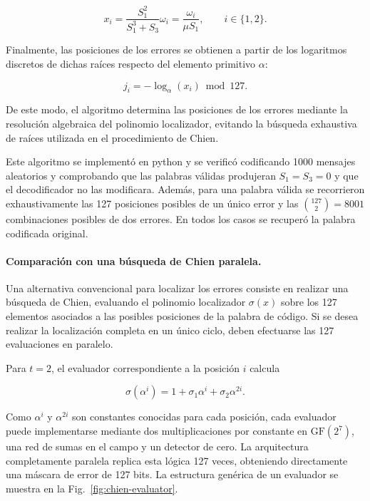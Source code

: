 \documentclass[10pt,a4paper]{article}
\begin{document}
\begin{equation}
    x_i
    =
    \frac{S_1^2}{S_1^3+S_3}\omega_i
    =
    \frac{\omega_i}{\mu S_1},
    \qquad i\in\{1,2\}.
\end{equation}

Finalmente, las posiciones de los errores se obtienen
a partir de los logaritmos discretos de dichas raíces
respecto del elemento primitivo $\alpha$:

\begin{equation}
    j_i
    =
    -\log_{\alpha}(x_i)\bmod127.
\end{equation}

De este modo, el algoritmo determina las posiciones de
los errores mediante la resolución algebraica del
polinomio localizador, evitando la búsqueda exhaustiva
de raíces utilizada en el procedimiento de Chien.

Este algoritmo se implementó en python y se verificó codificando 1000 mensajes
aleatorios y comprobando que las palabras válidas produjeran $S_1=S_3=0$ y
que el decodificador no las modificara. Además, para una palabra válida se
recorrieron exhaustivamente las 127 posiciones posibles de un único error y
las $\binom{127}{2}=8001$ combinaciones posibles de dos errores. En todos los
casos se recuperó la palabra codificada original.

\paragraph{Comparación con una búsqueda de Chien paralela.}
Una alternativa convencional para localizar los errores consiste en realizar
una búsqueda de Chien, evaluando el polinomio localizador
$\sigma(x)$ sobre los 127 elementos asociados a las posibles posiciones de la
palabra de código. Si se desea realizar la localización completa en un único
ciclo, deben efectuarse las 127 evaluaciones en paralelo.

Para $t=2$, el evaluador correspondiente a la posición $i$ calcula

\begin{equation}
    \sigma(\alpha^{i}) = 1 + \sigma_1\alpha^{i} + \sigma_2\alpha^{2i}.
\end{equation}

Como $\alpha^{i}$ y $\alpha^{2i}$ son constantes conocidas para cada
posición, cada evaluador puede implementarse mediante dos multiplicaciones por
constante en $\mathrm{GF}(2^7)$, una red de sumas en el campo y un detector de
cero. La arquitectura completamente paralela replica esta lógica 127 veces,
obteniendo directamente una máscara de error de 127 bits. La estructura
genérica de un evaluador se muestra en la Fig.~\ref{fig:chien-evaluator}.
\end{document}
